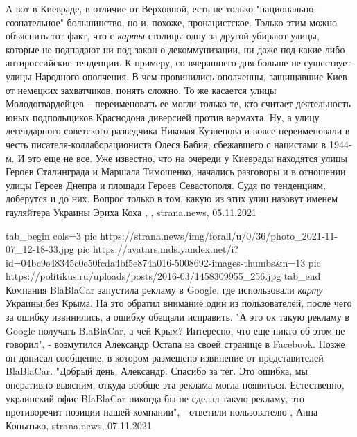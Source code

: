 А вот в Киевраде, в отличие от Верховной, есть не только
"национально-сознательное" большинство, но и, похоже, пронацистское. Только
этим можно объяснить тот факт, что с \emph{карты} столицы одну за другой
убирают улицы, которые не подпадают ни под закон о декоммунизации, ни даже под
какие-либо антироссийские тенденции.  К примеру, со вчерашнего дня больше не
существует улицы Народного ополчения. В чем провинились ополченцы, защищавшие
Киев от немецких захватчиков, понять сложно.  То же касается улицы
Молодогвардейцев – переименовать ее могли только те, кто считает деятельность
юных подпольщиков Краснодона диверсией против вермахта.  Ну, а улицу
легендарного советского разведчика Николая Кузнецова и вовсе переименовали в
честь писателя-коллаборациониста Олеся Бабия, сбежавшего с нацистами в 1944-м.
И это еще не все. Уже известно, что на очереди у Киеврады находятся улицы
Героев Сталинграда и Маршала Тимошенко, начались разговоры и в отношении улицы
Героев Днепра и площади Героев Севастополя. Судя по тенденциям, доберутся и до
них. Вопрос только в том, какую из этих улиц назовут именем гауляйтера Украины
Эриха Коха
, 
, strana.news, 05.11.2021

\ifcmt

\ifcmt
  tab_begin cols=3
    pic https://strana.news/img/forall/u/0/36/photo_2021-11-07_12-18-33.jpg
    pic https://avatars.mds.yandex.net/i?id=04bc9e48345c0e50fcda4bf5e874a016-5008692-images-thumbs&n=13
    pic https://politikus.ru/uploads/posts/2016-03/1458309955_256.jpg
  tab_end
\fi
Компания BlaBlaCar запустила рекламу в Google, где использовали \emph{карту} Украины
без Крыма. На это обратил внимание один из пользователей, после чего за ошибку
извинились, а ошибку обещали исправить.  "А это ок такую рекламу в Google
получать BlaBlaCar, а чей Крым? Интересно, что еще никто об этом не говорил", -
возмутился Александр Остапа на своей странице в Facebook.  Позже он дописал
сообщение, в котором размещено извинение от представителей BlaBlaCar.  "Добрый
день, Александр. Спасибо за тег. Это ошибка, мы оперативно выясним, откуда
вообще эта реклама могла появиться. Естественно, украинский офис BlaBlaCar
никогда бы не сделал такую рекламу, это противоречит позиции нашей компании", -
ответили пользователю
, 
Анна Копытько, strana.news, 07.11.2021
